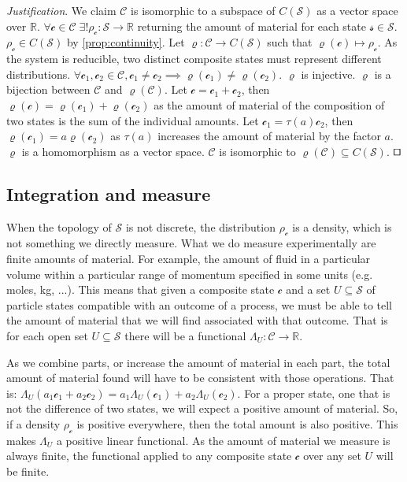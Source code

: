 \documentclass[smallextended]{svjour3}
\numberwithin{equation}{section}
\newenvironment{justification}{\emph{Justification}.}{\hfill\(\qed\)}
\theoremstyle{definition}
\newenvironment{justification}{\emph{Justification}.}{\qed}
\begin{document}
\begin{justification}
We claim $\mathcal{C}$ is isomorphic to a subspace of $C(\mathcal{S})$ as a vector space over $\mathbb{R}$. $\forall \mathcal{c} \in \mathcal{C} \; \exists ! \rho_{\mathcal{c}}:\mathcal{S} \rightarrow \mathbb{R}$ returning the amount of material for each state $\mathcal{s} \in \mathcal{S}$. $\rho_{\mathcal{c}} \in C(\mathcal{S})$ by \ref{prop:continuity}. Let $\varrho : \mathcal{C} \rightarrow C(\mathcal{S})$ such that $\varrho(\mathcal{c}) \mapsto \rho_\mathcal{c}$. 
As the system is reducible, two distinct composite states must represent different distributions. $\forall \mathcal{c_1}, \mathcal{c_2} \in \mathcal{C}, \mathcal{c_1} \neq \mathcal{c_2} \implies \varrho(\mathcal{c_1}) \neq \varrho(\mathcal{c_2})$. $\varrho$ is injective. $\varrho$ is a bijection between $\mathcal{C}$ and $\varrho(\mathcal{C})$. Let $\mathcal{c}=\mathcal{c}_1+\mathcal{c}_2$, then $\varrho(\mathcal{c})=\varrho(\mathcal{c}_1)+\varrho(\mathcal{c}_2)$ as the amount of material of the composition of two states is the sum of the individual amounts. Let $\mathcal{c}_1=\tau(a)\mathcal{c}_2$, then $\varrho(\mathcal{c}_1)=a \varrho(\mathcal{c}_2)$ as $\tau(a)$ increases the amount of material by the factor $a$. $\varrho$ is a homomorphism as a vector space. $\mathcal{C}$ is isomorphic to $\varrho(\mathcal{C}) \subseteq C(\mathcal{S})$.
\end{justification}

\subsection{Integration and measure}

When the topology of $\mathcal{S}$ is not discrete, the distribution $\rho_\mathcal{c}$ is a density, which is not something we directly measure. What we do measure experimentally are finite amounts of material. For example, the amount of fluid in a particular volume within a particular range of momentum specified in some units (e.g. moles, kg, ...). This means that given a composite state $\mathcal{c}$ and a set $U \subseteq \mathcal{S}$ of particle states compatible with an outcome of a process, we must be able to tell the amount of material that we will find associated with that outcome. That is for each open set $U \subseteq \mathcal{S}$ there will be a functional $\Lambda_U : \mathcal{C} \rightarrow \mathbb{R}$.

As we combine parts, or increase the amount of material in each part, the total amount of material found will have to be consistent with those operations. That is: $\Lambda_U(a_1 \mathcal{c}_1 + a_2 \mathcal{c}_2) = a_1 \Lambda_U(\mathcal{c}_1) + a_2 \Lambda_U(\mathcal{c}_2)$. For a proper state, one that is not the difference of two states, we will expect a positive amount of material. So, if a density $\rho_\mathcal{c}$ is positive everywhere, then the total amount is also positive. This makes $\Lambda_U$ a positive linear functional. As the amount of material we measure is always finite, the functional applied to any composite state $\mathcal{c}$ over any set $U$ will be finite.
\end{document}
